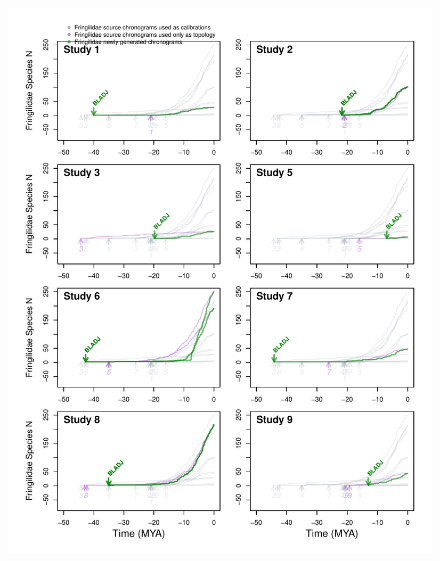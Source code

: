 \begin{figure}[!ht]
\includegraphics{fig_crossval_bladj.pdf}
\caption{}
\label{fig:cvbladj}
\end{figure}


